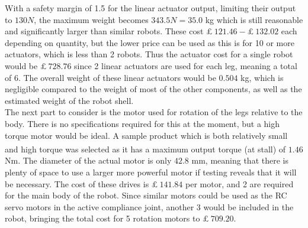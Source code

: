 \documentclass[11pt]{article}		%
\newcommand{\supercite}[1]{\textsuperscript{\cite{#1}}}		%
\begin{document}
		With a safety margin of 1.5 for the linear actuator output, limiting their output to $130 N$, the maximum weight becomes $343.5 N = 35.0$ kg which is still reasonable and significantly larger than similar robots.
		These cost $£ \ 121.46 - £ \ 132.02$ each depending on quantity, but the lower price can be used as this is for 10 or more actuators, which is less than 2 robots. 
		Thus the actuator cost for a single robot would be $£ \ 728.76$ since 2 linear actuators are used for each leg, meaning a total of 6.
		The overall weight of these linear actuators would be $0.504$ kg, which is negligible compared to the weight of most of the other components, as well as the estimated weight of the robot shell.
		\\
		The next part to consider is the motor used for rotation of the legs relative to the body. There is no specifications required for this at the moment, but a high torque motor would be ideal.
		A sample product which is both relatively small and high torque was selected\supercite{rsproRotation} as it has a maximum output torque (at stall) of $1.46$ Nm.
		The diameter of the actual motor is only $42.8$ mm, meaning that there is plenty of space to use a larger more powerful motor if testing reveals that it will be necessary.
		The cost of these drives is $£ \ 141.84$ per motor, and 2 are required for the main body of the robot.
		Since similar motors could be used as the RC servo motors in the active compliance joint, another 3 would be included in the robot, bringing the total cost for 5 rotation motors to $£ \ 709.20$.
		\\
\end{document}
